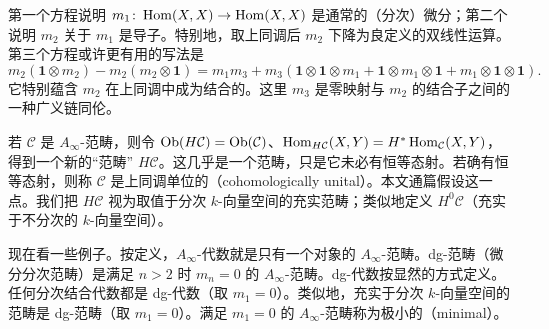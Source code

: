 

第一个方程说明 $m_1\colon\operatorname{Hom}(X,X)\to\operatorname{Hom}(X,X)$ 是通常的（分次）微分；第二个说明 $m_2$ 关于 $m_1$ 是导子。特别地，取上同调后 $m_2$ 下降为良定义的双线性运算。第三个方程或许更有用的写法是
\[
m_2(\mathbf{1}\otimes m_2)-m_2(m_2\otimes\mathbf{1})
=m_1m_3+m_3(\mathbf{1}\otimes\mathbf{1}\otimes m_1+\mathbf{1}\otimes m_1\otimes\mathbf{1}+m_1\otimes\mathbf{1}\otimes\mathbf{1}).
\]
它特别蕴含 $m_2$ 在上同调中成为结合的。这里 $m_3$ 是零映射与 $m_2$ 的结合子之间的一种广义链同伦。

若 $\mathcal{C}$ 是 $A_\infty$-范畴，则令 $\operatorname{Ob}(H\mathcal{C})=\operatorname{Ob}(\mathcal{C})$、$\operatorname{Hom}_{H\mathcal{C}}(X,Y)=H^*\operatorname{Hom}_{\mathcal{C}}(X,Y)$，得到一个新的“范畴” $H\mathcal{C}$。这几乎是一个范畴，只是它未必有恒等态射。若确有恒等态射，则称 $\mathcal{C}$ 是上同调单位的（cohomologically unital）。本文通篇假设这一点。我们把 $H\mathcal{C}$ 视为取值于分次 $k$-向量空间的充实范畴；类似地定义 $H^0\mathcal{C}$（充实于不分次的 $k$-向量空间）。


现在看一些例子。按定义，$A_\infty$-代数就是只有一个对象的 $A_\infty$-范畴。dg-范畴（微分分次范畴）是满足 $n>2$ 时 $m_n=0$ 的 $A_\infty$-范畴。dg-代数按显然的方式定义。任何分次结合代数都是 dg-代数（取 $m_1=0$）。类似地，充实于分次 $k$-向量空间的范畴是 dg-范畴（取 $m_1=0$）。满足 $m_1=0$ 的 $A_\infty$-范畴称为极小的（minimal）。

